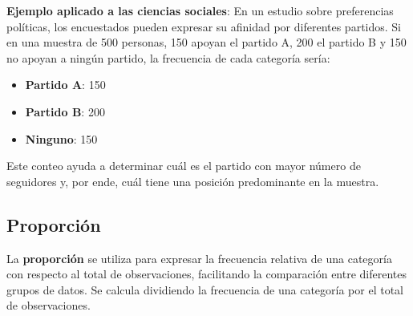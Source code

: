 \documentclass[
  letterpaper,
  DIV=11,
  numbers=noendperiod]{scrreprt}
\providecommand{\tightlist}{%
  \setlength{\itemsep}{0pt}\setlength{\parskip}{0pt}}\usepackage{longtable,booktabs,array}
\begin{document}
\begin{tcolorbox}[enhanced jigsaw, toprule=.15mm, opacitybacktitle=0.6, toptitle=1mm, arc=.35mm, left=2mm, title=\textcolor{quarto-callout-tip-color}{\faLightbulb}\hspace{0.5em}{Tip}, titlerule=0mm, leftrule=.75mm, rightrule=.15mm, coltitle=black, bottomtitle=1mm, bottomrule=.15mm, colframe=quarto-callout-tip-color-frame, opacityback=0, colback=white, breakable, colbacktitle=quarto-callout-tip-color!10!white]

\textbf{Ejemplo aplicado a las ciencias sociales}: En un estudio sobre
preferencias políticas, los encuestados pueden expresar su afinidad por
diferentes partidos. Si en una muestra de 500 personas, 150 apoyan el
partido A, 200 el partido B y 150 no apoyan a ningún partido, la
frecuencia de cada categoría sería:

\begin{itemize}
\tightlist
\item
  \textbf{Partido A}: 150
\item
  \textbf{Partido B}: 200
\item
  \textbf{Ninguno}: 150
\end{itemize}

Este conteo ayuda a determinar cuál es el partido con mayor número de
seguidores y, por ende, cuál tiene una posición predominante en la
muestra.

\end{tcolorbox}

\subsection{Proporción}\label{proporciuxf3n}

La \textbf{proporción} se utiliza para expresar la frecuencia relativa
de una categoría con respecto al total de observaciones, facilitando la
comparación entre diferentes grupos de datos. Se calcula dividiendo la
frecuencia de una categoría por el total de observaciones.
\end{document}
